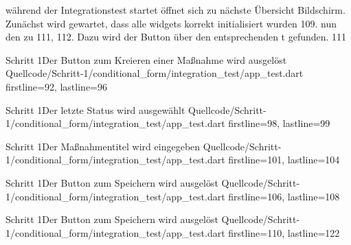 während der Integrationstest startet öffnet sich zu nächste Übersicht Bildschirm. Zunächst wird gewartet, dass alle widgets korrekt initialisiert wurden 109.  nun den zu 111, 112. Dazu wird der Button über den entsprechenden t gefunden. 111 












\begin{alexlisting}{Schritt 1}{Der Button zum Kreieren einer Maßnahme wird ausgelöst}
  {Quellcode/Schritt-1/conditional_form/integration_test/app_test.dart}
  {firstline=92, lastline=96}
  \label{lst:Schritt1ButtonKreierenMaßnahmeAusgeloest}
\end{alexlisting}

\begin{alexlisting}{Schritt 1}{Der letzte Status wird ausgewählt}
  {Quellcode/Schritt-1/conditional_form/integration_test/app_test.dart}
  {firstline=98, lastline=99}
  \label{lst:Schritt1LetzterStatusWirdAusgewählt}
\end{alexlisting}


\begin{alexlisting}{Schritt 1}{Der Maßnahmentitel wird eingegeben}
  {Quellcode/Schritt-1/conditional_form/integration_test/app_test.dart}
  {firstline=101, lastline=104}
  \label{lst:Schritt1MaßnahmentitelWirdEingegeben}
\end{alexlisting}



\begin{alexlisting}{Schritt 1}{Der Button zum Speichern wird ausgelöst}
  {Quellcode/Schritt-1/conditional_form/integration_test/app_test.dart}
  {firstline=106, lastline=108}
  \label{lst:Schritt1ButtonZumSpeichernWirdAusgelöst}
\end{alexlisting}

\begin{alexlisting}{Schritt 1}{Der Button zum Speichern wird ausgelöst}
  {Quellcode/Schritt-1/conditional_form/integration_test/app_test.dart}
  {firstline=110, lastline=122}
  \label{lst:Schritt1ErgebnisWirdVerglichen}
\end{alexlisting}


\clearpage
